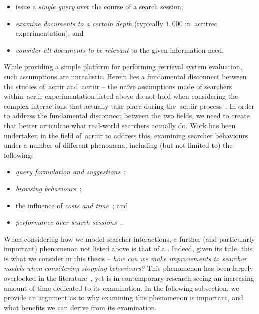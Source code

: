 \begin{itemize}
    \item{issue a \emph{single query} over the course of a search session;}
    \item{\emph{examine documents to a certain depth} (typically $1,000$ in~\gls{acr:trec} experimentation); and}
    \item{\emph{consider all documents to be relevant} to the given information need.}
\end{itemize}

While providing a simple platform for performing retrieval system evaluation, such assumptions are unrealistic. Herein lies a fundamental disconnect between the studies of~\gls{acr:ir} and~\gls{acr:iir} -- the na\"{i}ve assumptions made of searchers within~\gls{acr:ir} experimentation listed above do not hold when considering the complex interactions that actually take place during the~\gls{acr:iir} process~\citep{ingwersen2005theturn}. In order to address the fundamental disconnect between the two fields, we need to create  that better articulate what real-world searchers actually do. Work has been undertaken in the field of~\gls{acr:iir} to address this, examining searcher behaviours under a number of different phenomena, including (but not limited to) the following:

\begin{itemize}
    \item{\emph{query formulation and suggestions}~\citep{azzopardi2009query_side, azzopardi2007languages, baskaya2013behavioural_factors, carterette2015test_collections, jordan2006cqg, keskustalo2009querying, verberne2015personalised_queries};}
    \item{\emph{browsing behaviours}~\citep{carterette2015test_collections, chuklin2015click_models, guo2009click_chain, pakkonen2015behavioural_dimensions, smucker2011user_strategies};}
    \item{the influence of \emph{costs and time}~\citep{azzopardi2011economics, baskaya2013behavioural_factors}; and}
    \item{\emph{performance over search sessions}~\citep{luo2014winwin, luo2015pomdp}.}
\end{itemize}

When considering how we model searcher interactions, a further (and particularly important) phenomenon not listed above is that of a . Indeed, given its title, this is what we consider in this thesis -- \emph{how can we make improvements to searcher models when considering stopping behaviours?} This phenomenon has been largely overlooked in the literature~\citep{maxwell2015stopping_strategies}, yet is in contemporary research seeing an increasing amount of time dedicated to its examination. In the following subsection, we provide an argument as to why examining this phenomenon is important, and what benefits we can derive from its examination.

